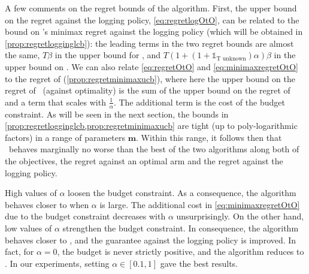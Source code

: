 A few comments on the regret bounds of the algorithm. First, the upper bound on the regret against the logging policy, \cref{eq:regretlogOtO}, can be related to the bound on \alglcb's minimax regret against the logging policy (which will be obtained in \cref{prop:regretlogginglcb}): the leading terms in the two regret bounds are almost the same, $T\beta$ in the upper bound for \alglcb, and $T\left(1+(1+\mathds{1}_{\text{T unknown}})\alpha\right)\beta $ in the upper bound on \algoname. We can also relate \cref{eq:regretOtO} and \cref{eq:minimaxregretOtO} to the regret of \algucb (\cref{prop:regretminimaxucb}), where here the upper bound on the regret of \algoname\ (against optimality) is the sum of the upper bound on the regret of \algucb and a term that scales with $\frac{1}{\alpha}$. The additional term is the cost of the budget constraint. As will be seen in the next section, the bounds in \cref{prop:regretlogginglcb,prop:regretminimaxucb} are tight (up to poly-logarithmic factors) in a range of parameters $\mathbf{m}$. Within this range, it follows then that \algoname\ behaves marginally no worse than the best of the two algorithms along both of the objectives, the regret against an optimal arm and the regret against the logging policy.

\begin{remark}
High values of $\alpha$ loosen the budget constraint. As a consequence, the algorithm behaves closer to \algucb when $\alpha$ is large. The additional cost in \cref{eq:minimaxregretOtO} due to the budget constraint decreases with $\alpha$ unsurprisingly. On the other hand, low values of $\alpha$ strengthen the budget constraint. In consequence, the algorithm behaves closer to \alglcb, and the guarantee against the logging policy is improved. In fact, for $\alpha=0$, the budget is never strictly positive, and the algorithm reduces to \alglcb. In our experiments, setting $\alpha\in [0.1,1]$ gave the best results.

\end{remark}
